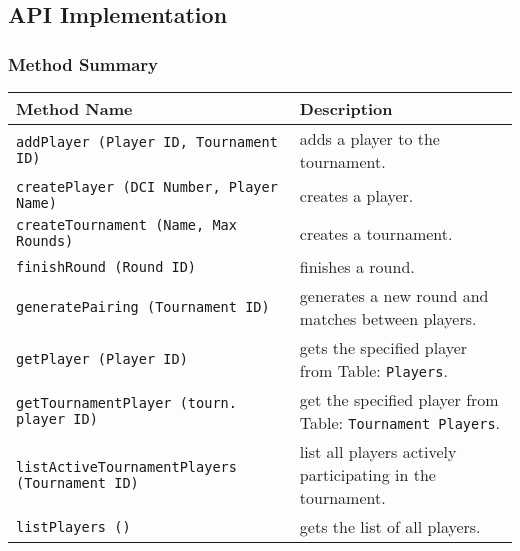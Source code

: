 \documentclass[11pt]{article}
\begin{document}
        \subsection {API Implementation}
            \subsubsection{Method Summary}
                \begin{table*}[!hp]
                    \centering
                    \begin{tabulary}{0.9\textwidth}{|p{27em}|p{16em}|}
                        \hline
                        \textbf{Method Name} & \textbf{Description}\\
                        \hline
                        \texttt{addPlayer (Player ID, Tournament ID)}                   & adds a player to the tournament.\\
                        \hline
                        \texttt{createPlayer (DCI Number, Player Name)}                 & creates a player.\\
                        \hline
                        \texttt{createTournament (Name, Max Rounds)}                    & creates a tournament.\\
                        \hline
                        \texttt{finishRound (Round ID)}                                 & finishes a round.\\
                        \hline
                        \texttt{generatePairing (Tournament ID)}                        & generates a new round and matches between players.\\
                        \hline
                        \texttt{getPlayer (Player ID)}                                  & gets the specified player from Table: \texttt{Players}.\\
                        \hline
                        \texttt{getTournamentPlayer (tourn. player ID)}                 & get the specified player from Table: \texttt{Tournament Players}.\\
                        \hline
                        \texttt{listActiveTournamentPlayers (Tournament ID)}            & list all players actively participating in the tournament.\\
                        \hline
                        \texttt{listPlayers ()}                                         & gets the list of all players.\\
                        \hline

\end{tabulary}
\end{table*}
\end{document}

